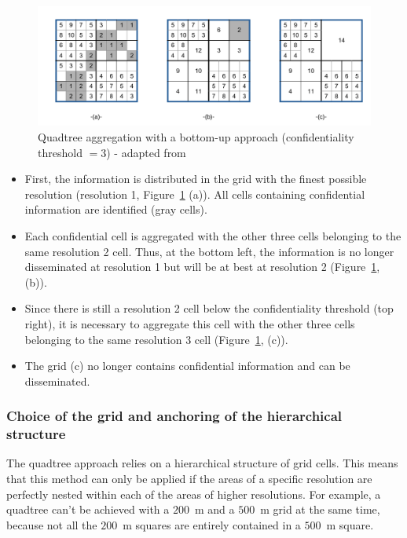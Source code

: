 \begin{figure}
    \centering
    \includegraphics[width=1\linewidth]{figures/Quadtree/adaptation_example_handbook_spat_ana.pdf}
    \caption{Quadtree aggregation with a bottom-up approach (confidentiality threshold $=3$) - adapted from \citet[p.358]{BuronFontaine2018}}
    \label{fig:quadtree_aggregation}
\end{figure}

\begin{itemize}
    \item First, the information is distributed in the grid with the finest possible resolution (resolution 1, Figure~\ref{fig:quadtree_aggregation} (a)). All cells containing confidential information are identified (gray cells).
    \item Each confidential cell is aggregated with the other three cells belonging to the same resolution 2 cell. Thus, at the bottom left, the information is no longer disseminated at resolution 1 but will be at best at resolution 2 (Figure~\ref{fig:quadtree_aggregation}, (b)).
    \item Since there is still a resolution 2 cell below the confidentiality threshold (top right), it is necessary to aggregate this cell with the other three cells belonging to the same resolution 3 cell (Figure~\ref{fig:quadtree_aggregation}, (c)).
    \item The grid (c) no longer contains confidential information and can be disseminated.
\end{itemize}

\subsubsection{Choice of the grid and anchoring of the hierarchical structure}

The quadtree approach relies on a hierarchical structure of grid cells. This means that this method can only be applied if the areas of a specific resolution are perfectly nested within each of the areas of higher resolutions. For example, a quadtree can't be achieved with a $200$~m and a $500$~m grid at the same time, because not all the $200$~m squares are entirely contained in a $500$~m square.\bigskip

